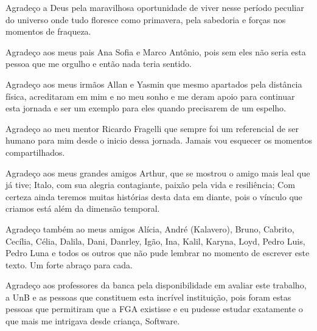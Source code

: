 \begin{agradecimentos}

Agradeço a Deus pela maravilhosa oportunidade de viver nesse período peculiar do universo onde tudo floresce como primavera, pela sabedoria e forças nos momentos de fraqueza.

Agradeço aos meus pais Ana Sofia e Marco Antônio, pois sem eles não seria esta pessoa que me orgulho e então nada teria sentido.

Agradeço aos meus irmãos Allan e Yasmin que mesmo apartados pela distância física, acreditaram em mim e no meu sonho e me deram apoio para continuar esta jornada e ser um exemplo para eles quando precisarem de um espelho.

Agradeço ao meu mentor Ricardo Fragelli que sempre foi um referencial de ser humano para mim desde o inicio dessa jornada. Jamais vou esquecer os momentos compartilhados.

Agradeço aos meus grandes amigos Arthur, que se mostrou o amigo mais leal que já tive; Italo, com sua alegria contagiante, paixão pela vida e resiliência; Com certeza ainda teremos muitas histórias desta data em diante, pois o vínculo que criamos está além da dimensão temporal.

Agradeço também ao meus amigos Alícia, André (Kalavero), Bruno, Cabrito, Cecília, Célia, Dalila, Dani, Danrley, Igão, Ina, Kalil, Karyna, Loyd, Pedro Luis, Pedro Luna e todos os outros que não pude lembrar no momento de escrever este texto. Um forte abraço para cada.

Agradeço aos professores da banca pela disponibilidade em avaliar este trabalho, a UnB e as pessoas que constituem esta incrível instituição, pois foram estas pessoas que permitiram que a FGA existisse e eu pudesse estudar exatamente o que mais me intrigava desde criança, Software.

\end{agradecimentos}
